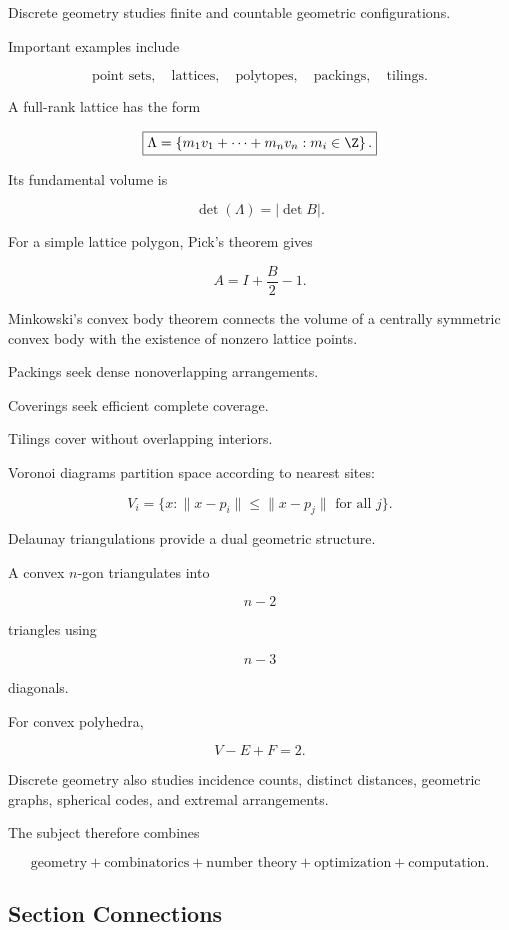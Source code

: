 Discrete geometry studies finite and countable geometric configurations.

Important examples include

\[
\boxed{
\text{point sets},
\quad
\text{lattices},
\quad
\text{polytopes},
\quad
\text{packings},
\quad
\text{tilings}.
}
\]

A full-rank lattice has the form

\[
\boxed{
\Lambda
=
\left\{
m_1v_1+\cdots+m_nv_n:
m_i\in\Z
\right\}.
}
\]

Its fundamental volume is

\[
\boxed{
\det(\Lambda)=|\det B|.
}
\]

For a simple lattice polygon, Pick's theorem gives

\[
\boxed{
A=I+\frac{B}{2}-1.
}
\]

Minkowski's convex body theorem connects the volume of a centrally symmetric
convex body with the existence of nonzero lattice points.

Packings seek dense nonoverlapping arrangements.

Coverings seek efficient complete coverage.

Tilings cover without overlapping interiors.

Voronoi diagrams partition space according to nearest sites:

\[
\boxed{
V_i
=
\{
x:\|x-p_i\|\leq\|x-p_j\|
\text{ for all }j
\}.
}
\]

Delaunay triangulations provide a dual geometric structure.

A convex \(n\)-gon triangulates into

\[
\boxed{
n-2
}
\]

triangles using

\[
\boxed{
n-3
}
\]

diagonals.

For convex polyhedra,

\[
\boxed{
V-E+F=2.
}
\]

Discrete geometry also studies incidence counts, distinct distances,
geometric graphs, spherical codes, and extremal arrangements.

The subject therefore combines

\[
\boxed{
\text{geometry}
+
\text{combinatorics}
+
\text{number theory}
+
\text{optimization}
+
\text{computation}.
}
\]

\subsection{Section Connections}
\label{subsec:discrete-geometry-connections}

